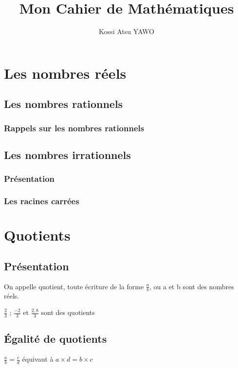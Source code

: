 \documentclass[12pt,a4paper]{book}
\title{Mon Cahier de Mathématiques}
\author{Kossi Atsu YAWO}
\begin{document}
\maketitle
\dominitoc %
\tableofcontents
\chapter{Les nombres réels}
\section{Les nombres rationnels}
\subsection{Rappels sur les nombres rationnels}
\section{Les nombres irrationnels}
\subsection{Présentation}
\subsection{Les racines carrées}

\chapter{Quotients}
\section{Présentation}
\begin{defn}
On appelle quotient, toute écriture de la forme $\frac{a}{b}$, ou a et b sont des nombres réels.
\end{defn}

\begin{exemple}
$\frac{2}{3}$ \qquad ; \qquad $\frac{-2}{3}$ \qquad  et \qquad $\frac{2,8}{3}$ \qquad  sont des quotients
\end{exemple}

\section{Égalité de quotients}
\begin{thm}
$\frac{a}{b} = \frac{c}{d}$ équivaut à $a\times d=b \times c$
\end{thm}
\end{document}
